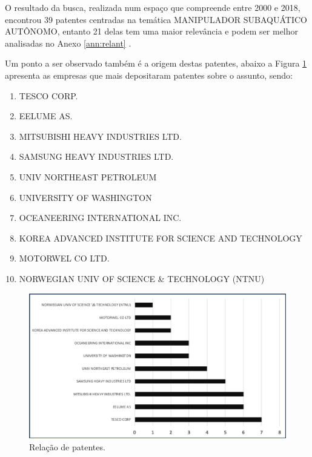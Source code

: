 O resultado da busca, realizada num espaço que compreende entre 2000 e 2018, encontrou 39 patentes centradas na temática MANIPULADOR SUBAQUÁTICO AUTÔNOMO, entanto 21 delas tem uma maior relevância e podem ser melhor analisadas no Anexo \ref{ann:relant} .

Um ponto a ser observado também é a origem destas patentes, abaixo a Figura \ref{fig:relpat} apresenta as empresas que mais depositaram patentes sobre o assunto, sendo: 
\begin{enumerate}
	\item TESCO CORP.
	\item EELUME AS.
	\item MITSUBISHI HEAVY INDUSTRIES LTD.
	\item SAMSUNG HEAVY INDUSTRIES LTD.
	\item UNIV NORTHEAST PETROLEUM
	\item UNIVERSITY OF WASHINGTON
	\item OCEANEERING INTERNATIONAL INC.
	\item KOREA ADVANCED INSTITUTE FOR SCIENCE AND TECHNOLOGY
	\item MOTORWEL CO LTD.
	\item NORWEGIAN UNIV OF SCIENCE \& TECHNOLOGY (NTNU)
\end{enumerate}

\begin{figure}[H] 
  \begin{center} 
  	\includegraphics[width=0.9 \textwidth]{images/patenteslist.png} 
  \end{center} 
  \caption{Relação de patentes.} 
  \label{fig:relpat} 
\end{figure}

